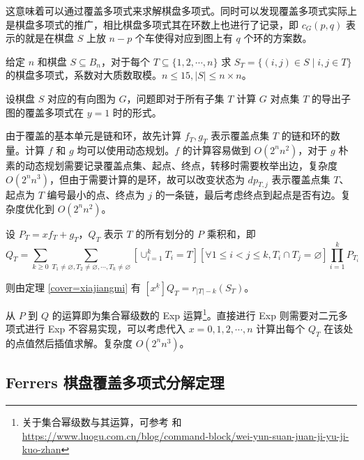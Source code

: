 \documentclass{noithesis}
\begin{document}
	这意味着可以通过覆盖多项式来求解棋盘多项式。同时可以发现覆盖多项式实际上是棋盘多项式的推广，相比棋盘多项式其在环数上也进行了记录，即 $c_G(p,q)$ 表示的就是在棋盘 $S$ 上放 $n-p$ 个车使得对应到图上有 $q$ 个环的方案数。
	
	\begin{problem}[棋盘多项式计算]
		给定 $n$ 和棋盘 $S \subseteq B_n$，对于每个 $T \subseteq \{1,2,\cdots,n\}$ 求 $S_T = \{(i,j) \in S \mid i,j \in T\}$ 的棋盘多项式，系数对大质数取模。$n \leq 15,|S| \leq n \times n$。
	\end{problem}
	
	设棋盘 $S$ 对应的有向图为 $G$，问题即对于所有子集 $T$ 计算 $G$ 对点集 $T$ 的导出子图的覆盖多项式在 $y=1$ 时的形式。
	
	由于覆盖的基本单元是链和环，故先计算 $f_T,g_T$ 表示覆盖点集 $T$ 的链和环的数量。计算 $f$ 和 $g$ 均可以使用动态规划。$f$ 的计算容易做到 $O(2^nn^2)$，对于 $g$ 朴素的动态规划需要记录覆盖点集、起点、终点，转移时需要枚举出边，复杂度 $O(2^nn^3)$，但由于需要计算的是环，故可以改变状态为 $dp_{T,j}$ 表示覆盖点集 $T$、起点为 $T$ 编号最小的点、终点为 $j$ 的一条链，最后考虑终点到起点是否有边。复杂度优化到 $O(2^nn^2)$。
	
	设 $P_T = xf_T+g_T$，$Q_T$ 表示 $T$ 的所有划分的 $P$ 乘积和，即 \begin{equation}
	Q_T = \sum_{k \geq 0} \sum_{T_1 \neq \varnothing , T_2 \neq \varnothing , \cdots , T_k \neq \varnothing} [\cup_{i=1}^k T_i = T][\forall 1 \leq i < j \leq k,T_i \cap T_j = \varnothing] \prod_{i=1}^k P_{T_i}
	\end{equation}
	
	则由定理 \ref{cover=xiajiangmi} 有 $[x^{\underline k}]Q_T = r_{|T|-k}(S_T)$。
	
	从 $P$ 到 $Q$ 的运算即为集合幂级数的 Exp 运算\footnote{关于集合幂级数与其运算，可参考 \cite{vfk} 和 \href{https://www.luogu.com.cn/blog/command-block/wei-yun-suan-juan-ji-yu-ji-kuo-zhan}{https://www.luogu.com.cn/blog/command-block/wei-yun-suan-juan-ji-yu-ji-kuo-zhan}}。直接进行 Exp 则需要对二元多项式进行 Exp 不容易实现，可以考虑代入 $x=0,1,2,\cdots,n$ 计算出每个 $Q_T$ 在该处的点值然后插值求解。复杂度 $O(2^nn^3)$。
	
	\subsection{Ferrers 棋盘覆盖多项式分解定理}
	
\end{document}
